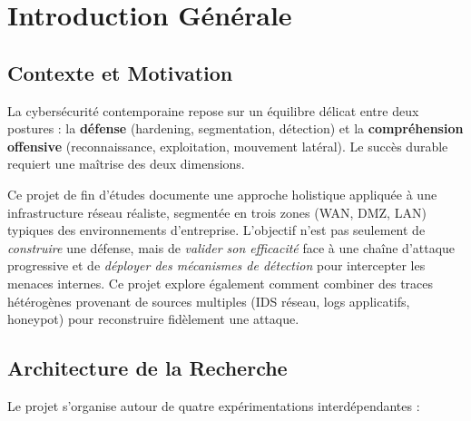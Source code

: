 \documentclass[12pt,a4paper,openany]{report}
\begin{document}
	\chapter{Introduction Générale}
	
	\section{Contexte et Motivation}
	
	La cybersécurité contemporaine repose sur un équilibre délicat entre deux postures : la \textbf{défense} (hardening, segmentation, détection) et la \textbf{compréhension offensive} (reconnaissance, exploitation, mouvement latéral). Le succès durable requiert une maîtrise des deux dimensions.
	
	Ce projet de fin d'études documente une approche holistique appliquée à une infrastructure réseau réaliste, segmentée en trois zones (WAN, DMZ, LAN) typiques des environnements d'entreprise. L'objectif n'est pas seulement de \textit{construire} une défense, mais de \textit{valider son efficacité} face à une chaîne d'attaque progressive et de \textit{déployer des mécanismes de détection} pour intercepter les menaces internes. Ce projet explore également comment combiner des traces hétérogènes provenant de sources multiples (IDS réseau, logs applicatifs, honeypot) pour reconstruire fidèlement une attaque.
	
	\section{Architecture de la Recherche}
	
	Le projet s'organise autour de quatre expérimentations interdépendantes :
	
\end{document}
